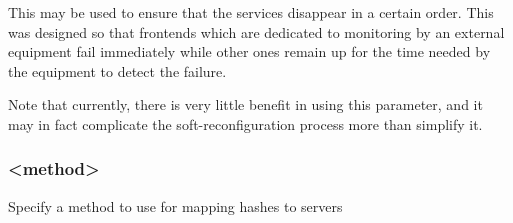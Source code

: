   This may be used to ensure that the services disappear in a certain order.
  This was designed so that frontends which are dedicated to monitoring by an
  external equipment fail immediately while other ones remain up for the time
  needed by the equipment to detect the failure.

  Note that currently, there is very little benefit in using this parameter,
  and it may in fact complicate the soft-reconfiguration process more than
  simplify it.

\subsubsection[hash-type]{ <method>}

  Specify a method to use for mapping hashes to servers
  
  

